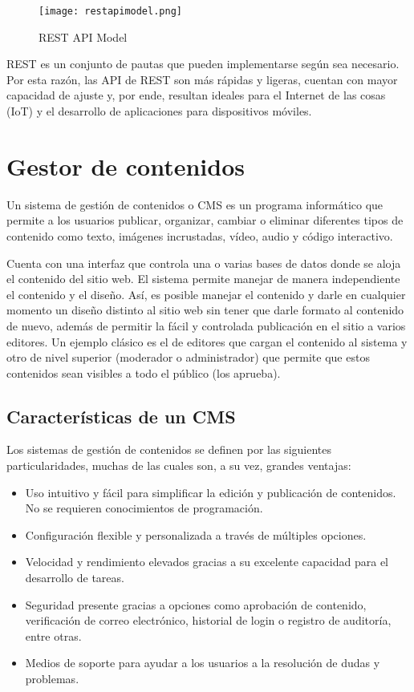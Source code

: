 \begin{figure}[H]
	\center
	\texttt{[image: restapimodel.png]}
	\caption{REST API Model}
	\label{fig:super}
\end{figure}

REST es un conjunto de pautas que pueden implementarse según sea necesario. Por esta razón, las API de REST son más rápidas y ligeras, cuentan con mayor capacidad de ajuste y, por ende, resultan ideales para el Internet de las cosas (IoT) y el desarrollo de aplicaciones para dispositivos móviles. 


\section{Gestor de contenidos}

\cite{mdn}Un sistema de gestión de contenidos o CMS es un programa informático que permite a los usuarios publicar, organizar, cambiar o eliminar diferentes tipos de contenido como texto, imágenes incrustadas, vídeo, audio y código interactivo.

\cite{wiki}Cuenta con una interfaz que controla una o varias bases de datos donde se aloja el contenido del sitio web. El sistema permite manejar de manera independiente el contenido y el diseño. Así, es posible manejar el contenido y darle en cualquier momento un diseño distinto al sitio web sin tener que darle formato al contenido de nuevo, además de permitir la fácil y controlada publicación en el sitio a varios editores. Un ejemplo clásico es el de editores que cargan el contenido al sistema y otro de nivel superior (moderador o administrador) que permite que estos contenidos sean visibles a todo el público (los aprueba).

\subsection{Características de un CMS}
Los sistemas de gestión de contenidos se definen por las siguientes particularidades, muchas de las cuales son, a su vez, grandes ventajas:

\begin{itemize}
	\item Uso intuitivo y fácil para simplificar la edición y publicación de contenidos. No se requieren conocimientos de programación.
	\item Configuración flexible y personalizada a través de múltiples opciones.
	\item Velocidad y rendimiento elevados gracias a su excelente capacidad para el desarrollo de tareas.
	\item Seguridad presente gracias a opciones como aprobación de contenido, verificación de correo electrónico, historial de login o registro de auditoría, entre otras.
	\item Medios de soporte para ayudar a los usuarios a la resolución de dudas y problemas.
\end{itemize}

